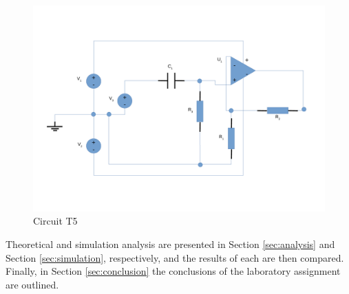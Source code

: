 \begin{figure}[ht]
	\centering
	\includegraphics[width=0.85\linewidth]{dsnh_t5.pdf}
	\caption{Circuit T5}
\label{fig:Desenho_t5}
\end{figure}

Theoretical and simulation analysis are presented in Section \ref{sec:analysis} and Section \ref{sec:simulation}, respectively, and the results of each are then compared.
Finally, in Section \ref{sec:conclusion} the conclusions of the laboratory assignment are outlined.

